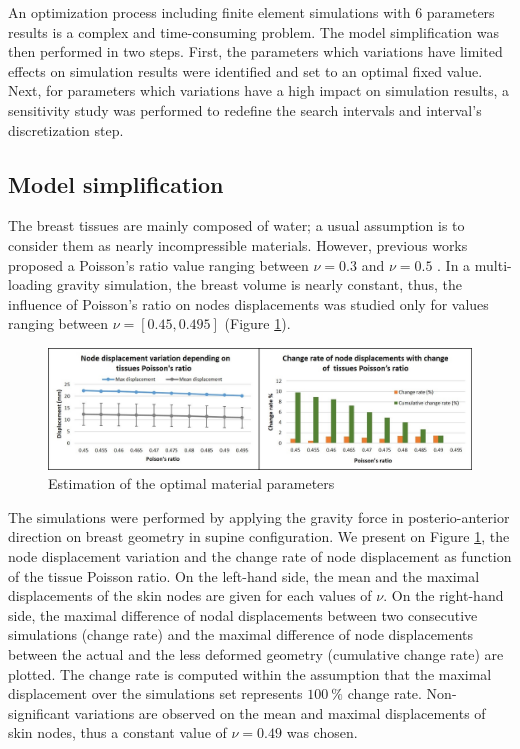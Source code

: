  An optimization process including finite element simulations with 6 parameters results is a complex and time-consuming problem. The model simplification was then performed in two steps. First, the parameters which variations have limited effects on simulation results were identified and set to an optimal fixed value. Next, for parameters which variations have a high impact on simulation results, a sensitivity study was performed to redefine the search intervals and interval's discretization step.
 
 \subsection{Model simplification}

The breast tissues are mainly composed of water; a usual assumption is to consider them as nearly incompressible materials\citep{fung_biomechanics_2013}. However,
previous works proposed a Poisson's ratio value ranging between $\nu = 0.3$ \citep{hopp_automatic_2013} and $\nu = 0.5$ \citep{gamage_modelling_2012}. In a multi-loading gravity simulation, the breast volume is nearly constant, thus, the influence of Poisson's ratio on nodes displacements was studied only for values ranging between $\nu = [0.45 , 0.495]$ (Figure \ref{fig:poissonRatio}). 

\begin{figure}[!h]
\centering
\includegraphics[width=\textwidth,keepaspectratio]{figures/poissonRatio.jpg} 
\caption{Estimation of the optimal material parameters}\label{fig:poissonRatio}
\end{figure}

The simulations were performed by applying the gravity force in posterio-anterior direction on breast geometry in supine configuration. We present on Figure \ref{fig:poissonRatio}, the node displacement variation and the change rate of node displacement as function of the tissue Poisson ratio. On the left-hand side, the mean and the maximal displacements of the skin nodes are given for each values of $\nu$. On the right-hand side, the maximal difference of nodal displacements between two consecutive simulations (change rate) and the maximal difference of node displacements between the actual and the less deformed geometry (cumulative change rate) are plotted. The change rate is computed within the assumption that the maximal displacement over the simulations set represents $100\ \%$ change rate. Non-significant variations are observed on the mean and maximal displacements of skin nodes, thus a constant value of $\nu = 0.49$ was chosen.


